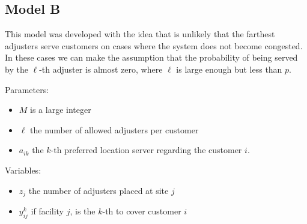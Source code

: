 
\subsection{Model B}
  
\begin{frame}
  This model was developed with the idea that is unlikely that
  the farthest adjusters serve customers on cases where the system does not become congested.
  In these cases we can make the assumption that the probability of being served by the $\ell$-th 
  adjuster is almost zero, where $\ell$ is large enough but less than $p$.

  Parameters:
  \begin{itemize}
  \item $M$ is a large integer
  \item $\ell$ the number of allowed adjusters per customer
  \item $a_{ik}$ the $k$-th preferred location server regarding the customer $i$.
  \end{itemize}

  Variables:
  \begin{itemize}
  \item $z_j$ the number of adjusters placed at site $j$
  \item $y_{ij}^k$ if facility $j$, is the $k$-th to cover customer $i$
  \end{itemize}

\end{frame}

